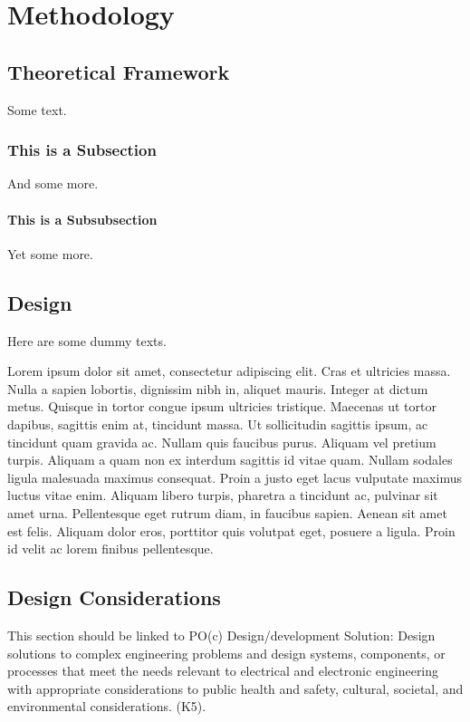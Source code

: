 \chapter{Methodology}\label{anotherchapter}


\section{Theoretical Framework}
Some text.
\subsection{This is a Subsection}
And some more.
\subsubsection{This is a Subsubsection}
Yet some more.

\section{Design}

Here are some dummy texts.

Lorem ipsum dolor sit amet, consectetur adipiscing elit. Cras et
ultricies massa. Nulla a sapien lobortis, dignissim nibh in, aliquet
mauris. Integer at dictum metus. Quisque in tortor congue ipsum
ultricies tristique. Maecenas ut tortor dapibus, sagittis enim at,
tincidunt massa. Ut sollicitudin sagittis ipsum, ac tincidunt quam
gravida ac. Nullam quis faucibus purus. Aliquam vel pretium
turpis. Aliquam a quam non ex interdum sagittis id vitae quam. Nullam
sodales ligula malesuada maximus consequat. Proin a justo eget lacus
vulputate maximus luctus vitae enim. Aliquam libero turpis, pharetra a
tincidunt ac, pulvinar sit amet urna. Pellentesque eget rutrum diam,
in faucibus sapien. Aenean sit amet est felis. Aliquam dolor eros,
porttitor quis volutpat eget, posuere a ligula. Proin id velit ac
lorem finibus pellentesque.

\section{Design Considerations}
This section should be linked to PO(c) Design/development Solution: Design solutions to complex engineering problems and design systems, components, or processes that meet the needs relevant to electrical and electronic engineering with appropriate considerations to public health and safety, cultural, societal, and environmental considerations. (K5).

